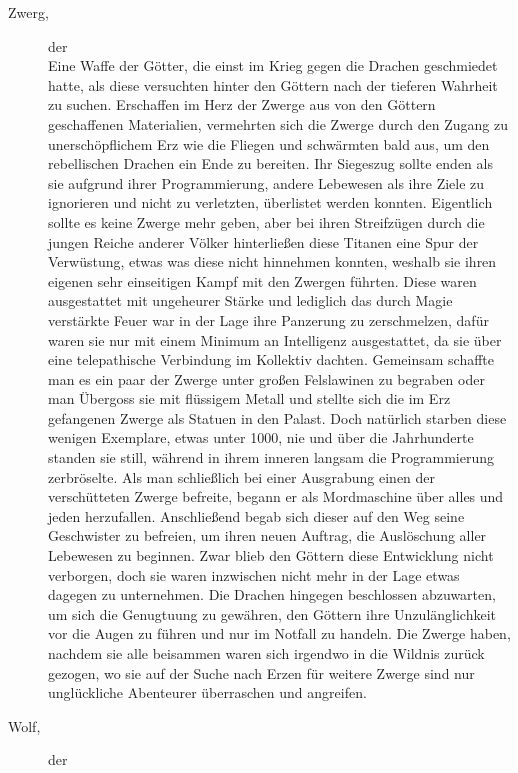 \documentclass[a4paper,12pt,oneside]{book}
\begin{document}
\begin{description}
\item[Zwerg,]der
\\Eine Waffe der Götter, die einst im Krieg gegen die Drachen geschmiedet hatte, als diese versuchten hinter den Göttern nach der tieferen Wahrheit zu suchen. Erschaffen im Herz der Zwerge aus von den Göttern geschaffenen Materialien, vermehrten sich die Zwerge durch den Zugang zu unerschöpflichem Erz wie die Fliegen und schwärmten bald aus, um den rebellischen Drachen ein Ende zu bereiten. Ihr Siegeszug sollte enden als sie aufgrund ihrer Programmierung, andere Lebewesen als ihre Ziele zu ignorieren und nicht zu verletzten, überlistet werden konnten. Eigentlich sollte es keine Zwerge mehr geben, aber bei ihren Streifzügen durch die jungen Reiche anderer Völker hinterließen diese Titanen eine Spur der Verwüstung, etwas was diese nicht hinnehmen konnten, weshalb sie ihren eigenen sehr einseitigen Kampf mit den Zwergen führten. Diese waren ausgestattet mit ungeheurer Stärke und lediglich das durch Magie verstärkte Feuer war in der Lage ihre Panzerung zu zerschmelzen, dafür waren sie nur mit einem Minimum an Intelligenz ausgestattet, da sie über eine telepathische Verbindung im Kollektiv dachten. Gemeinsam schaffte man es ein paar der Zwerge unter großen Felslawinen zu begraben oder man Übergoss sie mit flüssigem Metall und stellte sich die im Erz gefangenen Zwerge als Statuen in den Palast. Doch natürlich starben diese wenigen Exemplare, etwas unter 1000, nie und über die Jahrhunderte standen sie still, während in ihrem inneren langsam die Programmierung zerbröselte. Als man schließlich bei einer Ausgrabung einen der verschütteten Zwerge befreite, begann er als Mordmaschine über alles und jeden herzufallen. Anschließend begab sich dieser auf den Weg seine Geschwister zu befreien, um ihren neuen Auftrag, die Auslöschung aller Lebewesen zu beginnen. Zwar blieb den Göttern diese Entwicklung nicht verborgen, doch sie waren inzwischen nicht mehr in der Lage etwas dagegen zu unternehmen. Die Drachen hingegen beschlossen abzuwarten, um sich die Genugtuung zu gewähren, den Göttern ihre Unzulänglichkeit vor die Augen zu führen und nur im Notfall zu handeln. Die Zwerge haben, nachdem sie alle beisammen waren sich irgendwo in die Wildnis zurück gezogen, wo sie auf der Suche nach Erzen für weitere Zwerge sind nur unglückliche Abenteurer überraschen und angreifen.

\item[Wolf,]der

\end{description}
\end{document}
